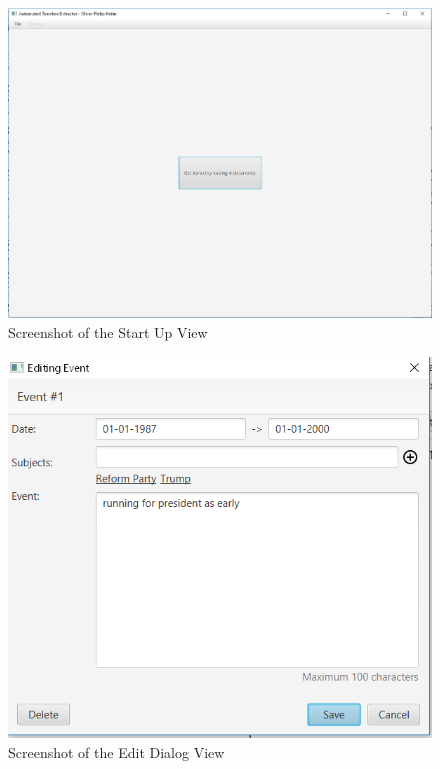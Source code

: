 \begin{figure}[H]
\caption{Screenshot of the Start Up View}
\label{fig:startUpImplemented}
\includegraphics[scale=0.5]{startUpImplemented.png}
\centering
\end{figure}
\begin{figure}[H]
\caption{Screenshot of the Edit Dialog View}
\label{fig:editDialogImplemented}
\includegraphics[scale=0.7]{editDialogImplemented.png}
\centering
\end{figure}
